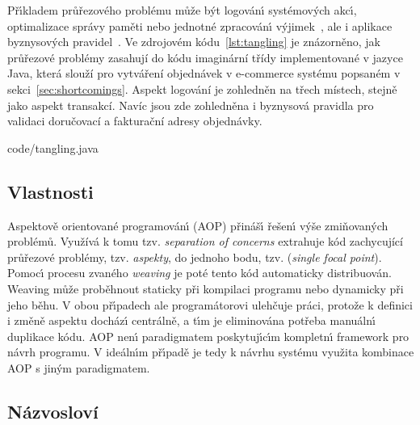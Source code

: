 Př\'{\i}kladem průřezového problému může b\'yt logován\'{\i}
systémov\'ych akc\'{\i}, optimalizace správy paměti
nebo jednotné zpracován\'{\i} v\'yjimek~\cite{kiczales1997aspect},
ale i aplikace byznysových pravidel~\cite{cemus2014aspect}.
Ve zdrojovém kódu~\ref{lst:tangling} je znázorněno, jak průřezové
problémy zasahují do kódu imaginární třídy implementované v
jazyce Java, která slouží pro vytváření objednávek v e-commerce
systému popsaném v sekci~\ref{sec:shortcomings}.
Aspekt logování je zohledněn na třech místech, stejně jako aspekt transakcí.
Navíc jsou zde zohledněna i byznysová pravidla pro validaci doručovací
a fakturační adresy objednávky.


{code/tangling.java}

\subsection{Vlastnosti}
Aspektově orientované programován\'{\i} (\gls{AOP}) přináš\'{\i} řešen\'{\i}
v\'yše zmiňovaných problémů. Využívá k tomu tzv. \textit{separation of concerns} \textendash\xspace
extrahuje kód zachycující průřezové problémy, tzv. \textit{aspekty}, do jednoho bodu, tzv. (\textit{single focal point}).
Pomoc\'{\i} procesu zvaného \textit{weaving} je poté tento kód automaticky distribuován.
Weaving může proběhnout staticky při kompilaci programu nebo dynamicky
při jeho běhu. V obou př\'{\i}padech ale programátorovi ulehčuje práci,
protože k definici i změně aspektu docház\'{\i} centrálně, a t\'{\i}m je eliminována
potřeba manuáln\'{\i} duplikace kódu. \gls{AOP} nen\'{\i} paradigmatem poskytuj\'{\i}c\'{\i}m
kompletn\'{\i} framework pro návrh programu. V ideáln\'{\i}m př\'{\i}padě je tedy k návrhu
systému využita kombinace \gls{AOP} s jin\'ym paradigmatem.

\subsection{Názvosloví}

